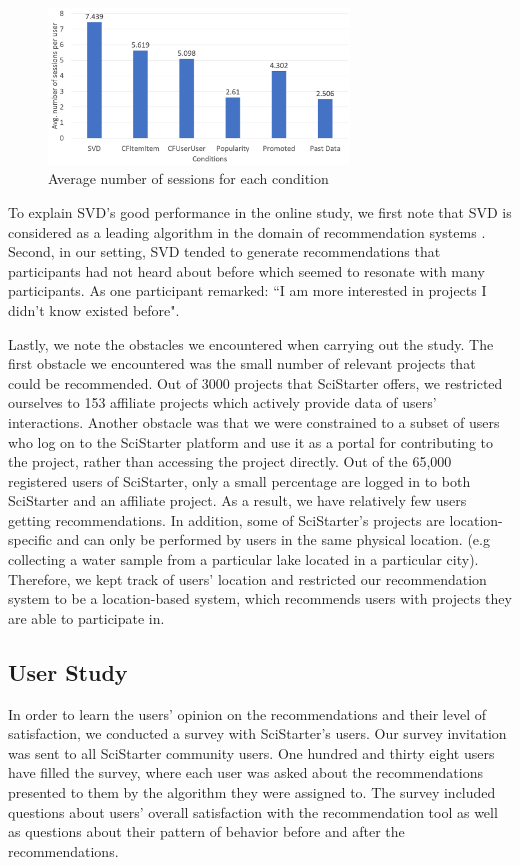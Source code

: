 \documentclass[letterpaper]{article} %
\begin{document}
\begin{figure}[t]
     \centering
    \includegraphics[width=8cm]{Figs/results2.png} 
    \caption{Average number of sessions  for each condition}
     \label{fig:results2}%
 \end{figure}


To explain SVD's good performance in the online study, we first note that SVD is considered as a leading algorithm in the domain of recommendation systems \cite{sadek2012svd}.  
Second, in our setting, SVD tended to generate recommendations that participants had not heard about before which seemed to resonate with many participants. As one participant remarked: ``I am more interested in projects I didn't know existed before". 

 
Lastly, we note the obstacles we encountered when carrying out the study. 
The first obstacle we encountered was the small number of relevant projects that could be recommended. Out of 3000 projects that SciStarter offers, we restricted ourselves to  153 affiliate projects which actively provide data of users' interactions.
Another obstacle was that we were constrained to a  subset of users who log on to the SciStarter platform 
 and use it as a portal for contributing to  the project, rather than accessing the project 
 directly. 
Out of the 65,000 registered users of SciStarter, only a small percentage are logged in to both SciStarter and an affiliate project. As a result, we have relatively few users getting recommendations. In addition, some of SciStarter's projects are location-specific and can only be performed by users in the same physical location. (e.g collecting a water sample from a particular lake located in a particular city). Therefore, we kept track of users' location and restricted our recommendation system to be a location-based system, which recommends users with projects they are able to participate in.



\subsection {User Study}
In order to learn the users' opinion on the recommendations and their level of satisfaction, we conducted a survey with SciStarter's users. Our survey invitation was sent to all SciStarter community users. One hundred and thirty eight users have filled the survey, where each user was asked about the recommendations presented to them by the  algorithm they were assigned to. The survey included questions about users' overall satisfaction with the recommendation tool as well as questions about their pattern of behavior before and after the recommendations.
\end{document}
